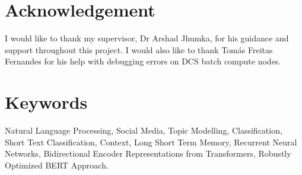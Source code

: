 \section*{Acknowledgement}
I would like to thank my supervisor, Dr Arshad Jhumka, for his guidance and support throughout this project. I would also like to thank
Tom\'as Freitas Fernandes for his help with debugging errors on DCS batch compute nodes.

\section*{Keywords}
Natural Language Processing, Social Media, Topic Modelling, Classification, Short Text Classification, Context,
Long Short Term Memory, Recurrent Neural Networks, Bidirectional Encoder Representations from Transformers,
Robustly Optimized BERT Approach.